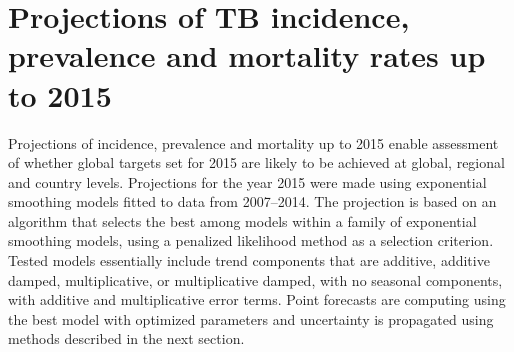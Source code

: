 \section{Projections of TB incidence, prevalence and mortality rates up to 2015} 

Projections of incidence, prevalence and mortality up to 2015 enable assessment of whether global targets set for 2015 are likely to be achieved at global, regional and country levels. Projections for the year 2015 were made using exponential smoothing models fitted to data from 2007–2014. The projection is based on an algorithm that selects the best among models within a family of exponential smoothing models, using a penalized likelihood method as a selection criterion\cite{Hyndman2008-ax}. Tested models essentially include trend components that are additive, additive damped, multiplicative, or multiplicative damped, with no seasonal components, with additive and multiplicative error terms. Point forecasts are computing using the best model with optimized parameters and uncertainty is propagated using methods described in the next section.

